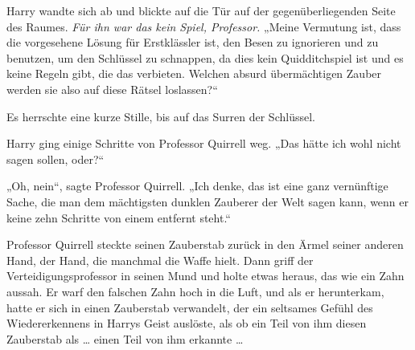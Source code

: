 Harry wandte sich ab und blickte auf die Tür auf der gegenüberliegenden Seite des Raumes.
\emph{Für ihn war das kein Spiel, Professor.}
„Meine Vermutung ist, dass die vorgesehene Lösung für Erstklässler ist, den Besen zu ignorieren und  zu benutzen, um den Schlüssel zu schnappen, da dies kein Quidditchspiel ist und es keine Regeln gibt, die das verbieten. Welchen absurd übermächtigen Zauber werden sie also auf diese Rätsel loslassen?“

Es herrschte eine kurze Stille, bis auf das Surren der Schlüssel.

Harry ging einige Schritte von Professor Quirrell weg.
„Das hätte ich wohl nicht sagen sollen, oder?“

„Oh, nein“, sagte Professor Quirrell.
„Ich denke, das ist eine ganz vernünftige Sache, die man dem mächtigsten dunklen Zauberer der Welt sagen kann, wenn er keine zehn Schritte von einem entfernt steht.“

Professor Quirrell steckte seinen Zauberstab zurück in den Ärmel seiner anderen Hand, der Hand, die manchmal die Waffe hielt.
Dann griff der Verteidigungsprofessor in seinen Mund und holte etwas heraus, das wie ein Zahn aussah. Er warf den falschen Zahn hoch in die Luft, und als er herunterkam, hatte er sich in einen Zauberstab verwandelt, der ein seltsames Gefühl des Wiedererkennens in Harrys Geist auslöste, als ob ein Teil von ihm diesen Zauberstab als … einen Teil von ihm erkannte …


